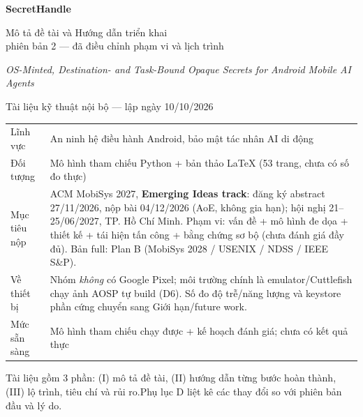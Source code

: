 \documentclass[11pt,a4paper]{article}
\begin{document}
\begin{titlepage}
\centering
\vspace*{1.2cm}
{\color{shblue}\Huge\bfseries SecretHandle\par}
\vspace{0.5cm}
{\Large Mô tả đề tài và Hướng dẫn triển khai\\[2pt] \normalsize phiên bản 2 --- đã điều chỉnh phạm vi và lịch trình\par}
\vspace{0.4cm}
{\large\itshape OS-Minted, Destination- and Task-Bound Opaque Secrets for Android Mobile AI Agents\par}
\vspace{1.0cm}
{\large Tài liệu kỹ thuật nội bộ --- lập ngày 10/10/2026\par}
\vspace{1.2cm}
\begin{tabularx}{\textwidth}{@{}>{\raggedleft\arraybackslash}p{3.3cm}X@{}}
\toprule
Lĩnh vực & An ninh hệ điều hành Android, bảo mật tác nhân AI di động \\
Đối tượng & Mô hình tham chiếu Python + bản thảo LaTeX (53 trang, chưa có số đo thực) \\
Mục tiêu nộp & ACM MobiSys 2027, \textbf{Emerging Ideas track}: đăng ký abstract 27/11/2026, nộp bài 04/12/2026 (AoE, không gia hạn); hội nghị 21--25/06/2027, TP. Hồ Chí Minh. Phạm vi: vấn đề + mô hình đe dọa + thiết kế + tái hiện tấn công + bằng chứng sơ bộ (chưa đánh giá đầy đủ). Bản full: Plan B (MobiSys 2028 / USENIX / NDSS / IEEE S\&P). \\
Về thiết bị & Nhóm \emph{không} có Google Pixel; môi trường chính là emulator/Cuttlefish chạy ảnh AOSP tự build (D6). Số đo độ trễ/năng lượng và keystore phần cứng chuyển sang Giới hạn/future work. \\
Mức sẵn sàng & Mô hình tham chiếu chạy được + kế hoạch đánh giá; chưa có kết quả thực \\
\bottomrule
\end{tabularx}
\vfill
{\small\color{shgray}Tài liệu gồm 3 phần: (I) mô tả đề tài, (II) hướng dẫn từng bước hoàn thành, (III) lộ trình, tiêu chí và rủi ro.\newline Phụ lục D liệt kê các thay đổi so với phiên bản đầu và lý do.\par}
\end{titlepage}

\tableofcontents
\newpage
\end{document}

